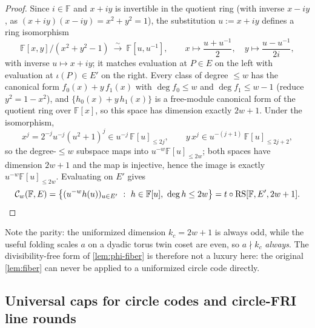 \documentclass[11pt]{article}
\theoremstyle{definition}
\theoremstyle{remark}
\newcommand{\F}{\mathbb{F}}
\newcommand{\RS}{\mathrm{RS}}
\begin{document}
\begin{proof}
Since $i\in\F$ and $x+iy$ is invertible in the quotient ring (with inverse $x-iy$, as $(x+iy)(x-iy)=x^2+y^2=1$), the substitution $u:=x+iy$ defines a ring isomorphism
\[
\F[x,y]/(x^2+y^2-1)\ \xrightarrow{\ \sim\ }\ \F[u,u^{-1}],
\qquad
x\mapsto\frac{u+u^{-1}}2,\quad y\mapsto\frac{u-u^{-1}}{2i},
\]
with inverse $u\mapsto x+iy$; it matches evaluation at $P\in E$ on the left with evaluation at $\iota(P)\in E'$ on the right. Every class of degree $\le w$ has the canonical form $f_0(x)+y\,f_1(x)$ with $\deg f_0\le w$ and $\deg f_1\le w-1$ (reduce $y^2=1-x^2$), and $\{h_0(x)+y\,h_1(x)\}$ is a free-module canonical form of the quotient ring over $\F[x]$, so this space has dimension exactly $2w+1$. Under the isomorphism,
\[
x^j=2^{-j}u^{-j}(u^2+1)^j\in u^{-j}\,\F[u]_{\le2j},
\qquad
y\,x^j\in u^{-(j+1)}\,\F[u]_{\le2j+2},
\]
so the degree-$\le w$ subspace maps into $u^{-w}\F[u]_{\le2w}$; both spaces have dimension $2w+1$ and the map is injective, hence the image is exactly $u^{-w}\F[u]_{\le2w}$. Evaluating on $E'$ gives
\[
\mathcal C_w(\F,E)
=\bigl\{(u^{-w}h(u))_{u\in E'}\ :\ h\in\F[u],\ \deg h\le2w\bigr\}
=t\circ\RS[\F,E',2w+1].
\qedhere
\]
\end{proof}

Note the parity: the uniformized dimension $k_c=2w+1$ is always odd, while the useful folding scales $a$ on a dyadic torus twin coset are even, so $a\nmid k_c$ \emph{always}. The divisibility-free form of \cref{lem:phi-fiber} is therefore not a luxury here: the original \cref{lem:fiber} can never be applied to a uniformized circle code directly.

\subsection{Universal caps for circle codes and circle-FRI line rounds}
\label{sec:circle-caps}
\end{document}
